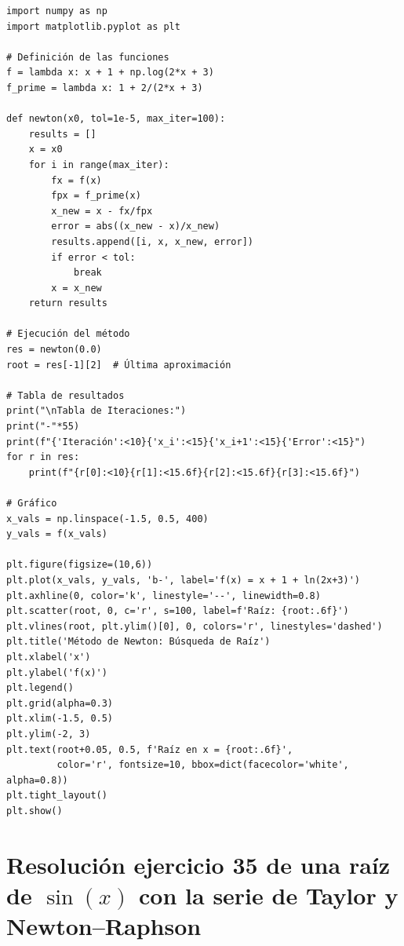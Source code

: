 \documentclass[12pt]{article}
\begin{document}
\begin{tcolorbox}[title=Código Python: Método de Newton para $f(x) = x + 1 + \ln(2x + 3)$, 
                  colback=white, colframe=black, breakable, enhanced]
\begin{lstlisting}[style=mypython]
import numpy as np
import matplotlib.pyplot as plt

# Definición de las funciones
f = lambda x: x + 1 + np.log(2*x + 3)
f_prime = lambda x: 1 + 2/(2*x + 3)

def newton(x0, tol=1e-5, max_iter=100):
    results = []
    x = x0
    for i in range(max_iter):
        fx = f(x)
        fpx = f_prime(x)
        x_new = x - fx/fpx
        error = abs((x_new - x)/x_new)
        results.append([i, x, x_new, error])
        if error < tol: 
            break
        x = x_new
    return results

# Ejecución del método
res = newton(0.0)
root = res[-1][2]  # Última aproximación

# Tabla de resultados
print("\nTabla de Iteraciones:")
print("-"*55)
print(f"{'Iteración':<10}{'x_i':<15}{'x_i+1':<15}{'Error':<15}")
for r in res:
    print(f"{r[0]:<10}{r[1]:<15.6f}{r[2]:<15.6f}{r[3]:<15.6f}")

# Gráfico
x_vals = np.linspace(-1.5, 0.5, 400)
y_vals = f(x_vals)

plt.figure(figsize=(10,6))
plt.plot(x_vals, y_vals, 'b-', label='f(x) = x + 1 + ln(2x+3)')
plt.axhline(0, color='k', linestyle='--', linewidth=0.8)
plt.scatter(root, 0, c='r', s=100, label=f'Raíz: {root:.6f}')
plt.vlines(root, plt.ylim()[0], 0, colors='r', linestyles='dashed')
plt.title('Método de Newton: Búsqueda de Raíz')
plt.xlabel('x')
plt.ylabel('f(x)')
plt.legend()
plt.grid(alpha=0.3)
plt.xlim(-1.5, 0.5)
plt.ylim(-2, 3)
plt.text(root+0.05, 0.5, f'Raíz en x = {root:.6f}', 
         color='r', fontsize=10, bbox=dict(facecolor='white', alpha=0.8))
plt.tight_layout()
plt.show()
\end{lstlisting}
\end{tcolorbox}












\section*{Resolución ejercicio 35 de una raíz de \(\sin(x)\) con la serie de Taylor y Newton–Raphson}
\end{document}
